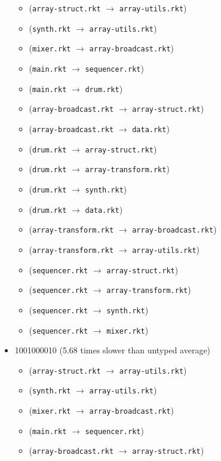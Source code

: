 \documentclass{article}
\newcommand{\mono}[1]{\texttt{#1}}
\begin{document}
\begin{itemize}
  \begin{itemize}
  \item (\mono{array-struct.rkt} $\rightarrow$ \mono{array-utils.rkt})
  \item (\mono{synth.rkt} $\rightarrow$ \mono{array-utils.rkt})
  \item (\mono{mixer.rkt} $\rightarrow$ \mono{array-broadcast.rkt})
  \item (\mono{main.rkt} $\rightarrow$ \mono{sequencer.rkt})
  \item (\mono{main.rkt} $\rightarrow$ \mono{drum.rkt})
  \item (\mono{array-broadcast.rkt} $\rightarrow$ \mono{array-struct.rkt})
  \item (\mono{array-broadcast.rkt} $\rightarrow$ \mono{data.rkt})
  \item (\mono{drum.rkt} $\rightarrow$ \mono{array-struct.rkt})
  \item (\mono{drum.rkt} $\rightarrow$ \mono{array-transform.rkt})
  \item (\mono{drum.rkt} $\rightarrow$ \mono{synth.rkt})
  \item (\mono{drum.rkt} $\rightarrow$ \mono{data.rkt})
  \item (\mono{array-transform.rkt} $\rightarrow$ \mono{array-broadcast.rkt})
  \item (\mono{array-transform.rkt} $\rightarrow$ \mono{array-utils.rkt})
  \item (\mono{sequencer.rkt} $\rightarrow$ \mono{array-struct.rkt})
  \item (\mono{sequencer.rkt} $\rightarrow$ \mono{array-transform.rkt})
  \item (\mono{sequencer.rkt} $\rightarrow$ \mono{synth.rkt})
  \item (\mono{sequencer.rkt} $\rightarrow$ \mono{mixer.rkt})
  \end{itemize}
\item 1001000010 (5.68 times slower than untyped average)
  \begin{itemize}
  \item (\mono{array-struct.rkt} $\rightarrow$ \mono{array-utils.rkt})
  \item (\mono{synth.rkt} $\rightarrow$ \mono{array-utils.rkt})
  \item (\mono{mixer.rkt} $\rightarrow$ \mono{array-broadcast.rkt})
  \item (\mono{main.rkt} $\rightarrow$ \mono{sequencer.rkt})
  \item (\mono{array-broadcast.rkt} $\rightarrow$ \mono{array-struct.rkt})

\end{itemize}
\end{itemize}
\end{document}
